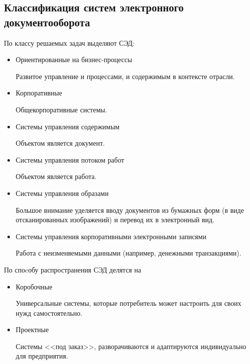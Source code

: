 \subsection{Классификация систем электронного документооборота} \label{review_classification}

По классу решаемых задач выделяют СЭД:
\begin{itemize}
	\item Ориентированные на бизнес-процессы

	Развитое управление и процессами, и содержимым в контексте отрасли.
	\item Корпоративные

	Общекорпоративные системы.
	\item Системы управления содержимым

	Объектом является документ.
	\item Системы управления потоком работ

	Объектом является работа.
	\item Системы управления образами

	Большое внимание уделяется вводу документов из бумажных форм (в виде отсканированных изображений) и перевод их в электронный вид.
	\item Системы управления корпоративными электронными записями

	Работа с неизменяемыми данными (например, денежными транзакциями).
\end{itemize}

\vspace{\baselineskip}
По споcобу распространения СЭД делятся на
\begin{itemize}
	\item Коробочные

	Универсальные системы, которые потребитель может настроить для своих нужд самостоятельно.
	\item Проектные

	Системы <<под заказ>>, разворачиваются и адаптируются индивидуально для предприятия.
\end{itemize}
